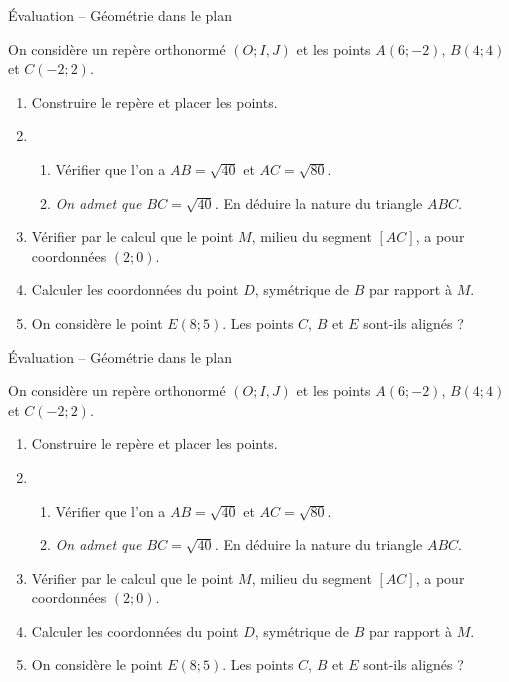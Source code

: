 \documentclass[11pt]{article}
\begin{document}
\vspace{1.3cm}
\begin{center}
  \LARGE Évaluation -- Géométrie dans le plan
\end{center}
\noindent On considère un repère orthonormé $(O; I, J)$ et les points $A(6;
-2)$, $B(4; 4)$ et $C(-2;2)$.
\begin{enumerate}
  \item Construire le repère et placer les points.
  \item \begin{enumerate}
      \item Vérifier que l'on a $AB=\sqrt{40}$ et $AC=\sqrt{80}$.
      \item \emph{On admet que $BC=\sqrt{40}$.} En déduire la nature du triangle $ABC$.
    \end{enumerate}
  \item Vérifier  par le calcul que le point $M$, milieu du segment $\left[ AC
    \right]$, a pour coordonnées $(2;0)$.
  \item Calculer les coordonnées du point $D$, symétrique de $B$ par rapport
    à $M$.
  \item On considère le point $E(8;5)$. Les points $C$, $B$ et $E$ sont-ils
    alignés ?
\end{enumerate}

\vspace{1.3cm}
\begin{center}
  \LARGE Évaluation -- Géométrie dans le plan
\end{center}
\noindent On considère un repère orthonormé $(O; I, J)$ et les points $A(6;
-2)$, $B(4; 4)$ et $C(-2;2)$.
\begin{enumerate}
  \item Construire le repère et placer les points.
  \item \begin{enumerate}
      \item Vérifier que l'on a $AB=\sqrt{40}$ et $AC=\sqrt{80}$.
      \item \emph{On admet que $BC=\sqrt{40}$.} En déduire la nature du triangle $ABC$.
    \end{enumerate}
  \item Vérifier  par le calcul que le point $M$, milieu du segment $\left[ AC
    \right]$, a pour coordonnées $(2;0)$.
  \item Calculer les coordonnées du point $D$, symétrique de $B$ par rapport
    à $M$.
  \item On considère le point $E(8;5)$. Les points $C$, $B$ et $E$ sont-ils
    alignés ?
\end{enumerate}
\end{document}
